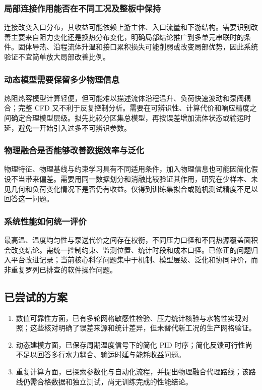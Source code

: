 \documentclass[stage2,UTF8,fontset=fandol]{ydzjreport}
\begin{document}
\subsubsection{局部连接作用能否在不同工况及整板中保持}
连接改变入口分布，其收益可能依赖上游主体、入口流量和下游结构。需要识别改善主要来自阻力变化还是换热分布变化，明确局部结论推广到多单元串联时的条件。固体导热、沿程流体升温和接口累积损失可能削弱或改变局部优势，因此系统验证不宜简单放大局部改善比例。

\subsubsection{动态模型需要保留多少物理信息}
热阻热容模型计算轻便，但可能难以描述流体沿程温升、负荷快速波动和泵阀耦合；完整 CFD 又不利于反复控制分析。需要在可辨识性、计算代价和响应精度之间确定合理模型层级。拟先比较分区集总模型，再按误差增加流体状态或输运时延，避免一开始引入过多不可辨识参数。

\subsubsection{物理融合是否能够改善数据效率与泛化}
物理特征、物理基线与约束学习具有不同适用条件，加入物理信息也可能因简化假设不当带来偏差。需要用同一数据划分和消融比较验证其作用，研究在少样本、未见几何和负荷变化情况下是否仍有收益。仅得到训练集拟合或随机测试精度不足以回答这一问题。

\subsubsection{系统性能如何统一评价}
最高温、温度均匀性与泵送代价之间存在权衡，不同压力口径和不同热源覆盖面积会改变结论。需统一控制约束、监测位置、统计时段和成本口径。已修正的问题归入平台改进记录；当前核心科学问题集中于机制、模型层级、泛化和协同评价，而非重复罗列已排查的软件操作问题。

\subsection{已尝试的方案}
\begin{enumerate}
\item 数值可靠性方面，已有多轮网格敏感性检验、压力统计核验与水物性实现对照；这些核对明确了误差来源和统计差异，但未替代新工况的生产网格验证。
\item 动态建模方面，已保存周期温度信号下的简化 PID 时序；简化反馈可行性尚不足以回答多行水力耦合、输运时延与能耗收益问题。
\item 重复计算方面，已探索参数化与自动化流程，并提出物理融合代理路线；该路线仍需合格数据和独立测试，尚无训练完成的性能结论。
\end{enumerate}
\end{document}
